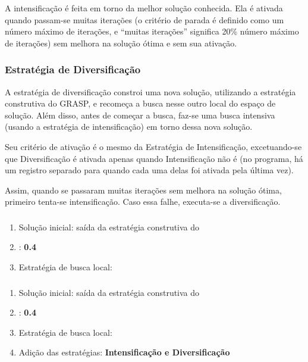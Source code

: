 A intensificação é feita em torno da melhor solução conhecida. Ela é ativada quando passam-se muitas iterações (o critério de parada é definido como um número máximo de iterações, e ``muitas iterações'' significa 20\% número máximo de iterações) sem melhora na solução ótima e sem sua ativação.

\subsubsection{Estratégia de Diversificação}
\label{subsubsection:tabu-diversification}

A estratégia de diversificação constroi uma nova solução, utilizando a estratégia construtiva do GRASP, e recomeça a busca nesse outro local do espaço de solução. Além disso, antes de começar a busca, faz-se uma busca intensiva (usando a estratégia de intensificação) em torno dessa nova solução.

Seu critério de ativação é o mesmo da Estratégia de Intensificação, excetuando-se que Diversificação é ativada apenas quando Intensificação não é (no programa, há um registro separado para quando cada uma delas foi ativada pela última vez).

Assim, quando se passaram muitas iterações sem melhora na solução ótima, primeiro tenta-se intensificação. Caso essa falhe, executa-se a diversificação.

\subsubsection{\tabuVanilla}
\label{subsubsection:tabu-vanilla}

\begin{enumerate}
    \item Solução inicial: saída da estratégia construtiva do \grasp
    \item \tenureRatio: \textbf{0.4}
    \item Estratégia de busca local: \textbf{\bestImproving}
\end{enumerate}

\subsubsection{\tabuMod}
\label{subsubsection:tabu-mod}

\begin{enumerate}
    \item Solução inicial: saída da estratégia construtiva do \grasp
    \item \tenureRatio: \textbf{0.4}
    \item Estratégia de busca local: \textbf{\bestImproving}
    \item Adição das estratégias: \textbf{Intensificação e Diversificação}
\end{enumerate}
